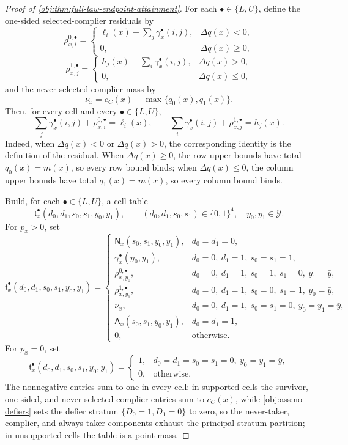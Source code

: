 \documentclass[11pt]{article}
\begin{document}
\begin{proof}[Proof of \cref{obj:thm:full-law-endpoint-attainment}]
For each \(\bullet\in\{L,U\}\), define the one-sided selected-complier residuals by
\[
\rho^{0,\bullet}_{x,i}
=
\begin{cases}
\ell_i(x)-\sum_j\gamma^\bullet_x(i,j),& \Delta q(x)<0,\\
0,& \Delta q(x)\ge 0,
\end{cases}
\]
\[
\rho^{1,\bullet}_{x,j}
=
\begin{cases}
h_j(x)-\sum_i\gamma^\bullet_x(i,j),& \Delta q(x)>0,\\
0,& \Delta q(x)\le 0,
\end{cases}
\]
and the never-selected complier mass by
\[
\nu_x=\bar c_C(x)-\max\{q_0(x),q_1(x)\}.
\]
Then, for every cell and every \(\bullet\in\{L,U\}\),
\[
\sum_j\gamma^\bullet_x(i,j)+\rho^{0,\bullet}_{x,i}=\ell_i(x),
\qquad
\sum_i\gamma^\bullet_x(i,j)+\rho^{1,\bullet}_{x,j}=h_j(x).
\]
Indeed, when \(\Delta q(x)<0\) or \(\Delta q(x)>0\), the corresponding identity is the definition of the residual.  When \(\Delta q(x)\ge0\), the row upper bounds have total \(q_0(x)=m(x)\), so every row bound binds; when \(\Delta q(x)\le0\), the column upper bounds have total \(q_1(x)=m(x)\), so every column bound binds. %

Build, for each \(\bullet\in\{L,U\}\), a cell table
\[
\mathfrak t^\bullet_x(d_0,d_1,s_0,s_1,y_0,y_1),
\qquad
(d_0,d_1,s_0,s_1)\in\{0,1\}^4,\quad y_0,y_1\in\mathcal Y.
\]
For \(p_x>0\), set
\[
\mathfrak t^\bullet_x(d_0,d_1,s_0,s_1,y_0,y_1)
=
\begin{cases}
\mathsf N_x(s_0,s_1,y_0,y_1),& d_0=d_1=0,\\
\gamma^\bullet_x(y_0,y_1),& d_0=0,\ d_1=1,\ s_0=s_1=1,\\
\rho^{0,\bullet}_{x,y_0},& d_0=0,\ d_1=1,\ s_0=1,\ s_1=0,\ y_1=\bar y,\\
\rho^{1,\bullet}_{x,y_1},& d_0=0,\ d_1=1,\ s_0=0,\ s_1=1,\ y_0=\bar y,\\
\nu_x,& d_0=0,\ d_1=1,\ s_0=s_1=0,\ y_0=y_1=\bar y,\\
\mathsf A_x(s_0,s_1,y_0,y_1),& d_0=d_1=1,\\
0,& \text{otherwise.}
\end{cases}
\]
For \(p_x=0\), set
\[
\mathfrak t^\bullet_x(d_0,d_1,s_0,s_1,y_0,y_1)
=
\begin{cases}
1,& d_0=d_1=s_0=s_1=0,\ y_0=y_1=\bar y,\\
0,& \text{otherwise.}
\end{cases}
\]
The nonnegative entries sum to one in every cell: in supported cells the survivor, one-sided, and never-selected complier entries sum to \(\bar c_C(x)\), while \cref{obj:ass:no-defiers} sets the defier stratum \(\{D_0=1,D_1=0\}\) to zero, so the never-taker, complier, and always-taker components exhaust the principal-stratum partition; in unsupported cells the table is a point mass. %


\end{proof}
\end{document}
